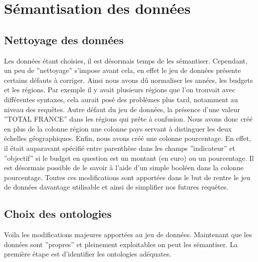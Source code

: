 \documentclass[a4paper,sffamily,12pt]{article}
\begin{document}
		\vspace{0.5cm}
		
	\section{Sémantisation des données}				

		\vspace{0.5cm}
		
		\subsection{Nettoyage des données}
			
			\vspace{0.5cm}
			
			Les données étant choisies, il est désormais temps de les sémantiser. Cependant, un peu de ''nettoyage'' s'impose avant cela, en effet le jeu de données présente certains défauts à corriger. Ainsi nous avons dû normaliser les années, les budgets et les régions. Par exemple il y avait plusieurs régions que l'on trouvait avec différentes syntaxes, cela aurait posé des problèmes plus tard, notamment au niveau des requêtes. Autre défaut du jeu de données, la présence d'une valeur ''TOTAL FRANCE'' dans les régions qui prête à confusion. Nous avons donc créé en plus de la colonne région une colonne pays servant à distinguer les deux échelles géographiques. Enfin, nous avons créé une colonne pourcentage. En effet, il était auparavant spécifié entre parenthèse dans les champs ''indicateur'' et ''objectif'' si le budget en question est un montant (en euro) ou un pourcentage. Il est désormais possible de le savoir à l'aide d'un simple booléen dans la colonne pourcentage. Toutes ces modifications sont apportées dans le but de rentre le jeu de données davantage utilisable et ainsi de simplifier nos futures requêtes.
		
			\vspace{0.5cm}
		
		\subsection{Choix des ontologies}
		
			\vspace{0.5cm}
			
			Voila les modifications majeures apportées au jeu de données. Maintenant que les données sont ''propres'' et pleinement exploitables on peut les sémantiser. La première étape est d'identifier les ontologies adéquates. \\
		
\end{document}
